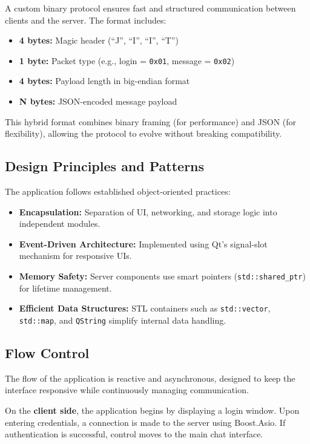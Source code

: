 \documentclass[12pt,a4paper]{article}
\begin{document}
  A custom binary protocol ensures fast and structured communication between clients and the server. The format includes:
  \begin{itemize}
	  \item \textbf{4 bytes:} Magic header (``J'', ``I'', ``I'', ``T'')
	  \item \textbf{1 byte:} Packet type (e.g., login = \texttt{0x01}, message = \texttt{0x02})
	  \item \textbf{4 bytes:} Payload length in big-endian format
	  \item \textbf{N bytes:} JSON-encoded message payload
  \end{itemize}
  
  This hybrid format combines binary framing (for performance) and JSON (for flexibility), allowing the protocol to evolve without breaking compatibility.
  
  \subsection{Design Principles and Patterns}
  
  The application follows established object-oriented practices:
  \begin{itemize}
	  \item \textbf{Encapsulation:} Separation of UI, networking, and storage logic into independent modules.
	  \item \textbf{Event-Driven Architecture:} Implemented using Qt's signal-slot mechanism for responsive UIs.
	  \item \textbf{Memory Safety:} Server components use smart pointers (\texttt{std::shared\_ptr}) for lifetime management.
	  \item \textbf{Efficient Data Structures:} STL containers such as \texttt{std::vector}, \texttt{std::map}, and \texttt{QString} simplify internal data handling.
  \end{itemize}
  
  \subsection{Flow Control}
  
  The flow of the application is reactive and asynchronous, designed to keep the interface responsive while continuously managing communication.
  
  On the \textbf{client side}, the application begins by displaying a login window. Upon entering credentials, a connection is made to the server using Boost.Asio. If authentication is successful, control moves to the main chat interface.
  
\end{document}
